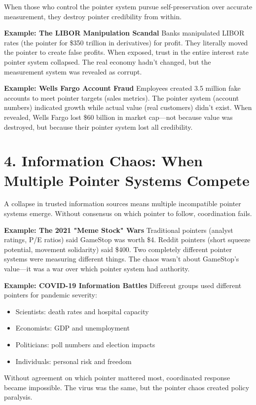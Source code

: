 \documentclass[11pt,oneside]{book}
\begin{document}
When those who control the pointer system pursue self-preservation over accurate measurement, they destroy pointer credibility from within.

\textbf{Example: The LIBOR Manipulation Scandal}
Banks manipulated LIBOR rates (the pointer for \$350 trillion in derivatives) for profit. They literally moved the pointer to create false profits. When exposed, trust in the entire interest rate pointer system collapsed. The real economy hadn't changed, but the measurement system was revealed as corrupt.

\textbf{Example: Wells Fargo Account Fraud}
Employees created 3.5 million fake accounts to meet pointer targets (sales metrics). The pointer system (account numbers) indicated growth while actual value (real customers) didn't exist. When revealed, Wells Fargo lost \$60 billion in market cap—not because value was destroyed, but because their pointer system lost all credibility.
\section{4. Information Chaos: When Multiple Pointer Systems Compete}

A collapse in trusted information sources means multiple incompatible pointer systems emerge. Without consensus on which pointer to follow, coordination fails.

\textbf{Example: The 2021 "Meme Stock" Wars}
Traditional pointers (analyst ratings, P/E ratios) said GameStop was worth \$4. Reddit pointers (short squeeze potential, movement solidarity) said \$400. Two completely different pointer systems were measuring different things. The chaos wasn't about GameStop's value—it was a war over which pointer system had authority.

\textbf{Example: COVID-19 Information Battles}
Different groups used different pointers for pandemic severity:
\begin{itemize}
\item Scientists: death rates and hospital capacity
\item Economists: GDP and unemployment
\item Politicians: poll numbers and election impacts
\item Individuals: personal risk and freedom
\end{itemize}

Without agreement on which pointer mattered most, coordinated response became impossible. The virus was the same, but the pointer chaos created policy paralysis.
\end{document}
